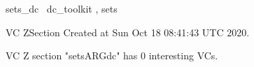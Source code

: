 \documentclass{article}
\begin{document}

\begin{zsection}	 \SECTION sets\_dc \parents~dc\_toolkit , sets
\end{zsection}

\newcommand{\appliesTo}{\zbinop{appliesTo}} 
\newcommand{\appliesToNofix}{\zpreop{appliesToNofix}} 

VC ZSection Created at Sun Oct 18 08:41:43 UTC 2020.



 VC Z section "setsARGdc" has $0$ interesting VCs.



\end{document}
